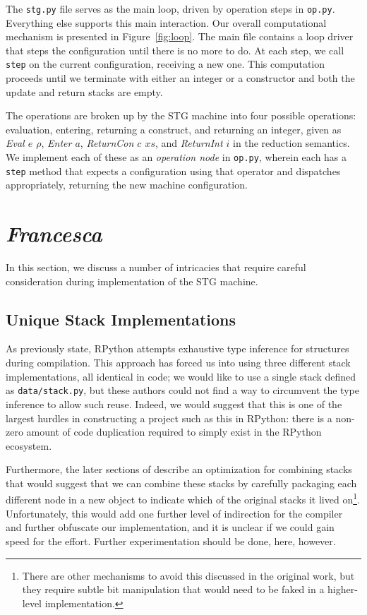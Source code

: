 \documentclass[preprint]{sigplanconf}
\begin{document}
The \lstinline{stg.py} file serves as the main loop, driven by operation steps
in \lstinline{op.py}. Everything else supports this main interaction.  
Our overall computational mechanism is presented in Figure~\ref{fig:loop}. The
main file contains a loop driver that steps the configuration until there is no
more to do. At each step, we call \lstinline{step} on the current configuration,
receiving a new one. This computation proceeds until we terminate with either
an integer or a constructor and both the update and return stacks are empty.

The operations are broken up by the STG machine into four possible operations:
evaluation, entering, returning a construct, and returning an integer, given
as \emph{Eval $e$ $\rho$}, \emph{Enter $a$}, \emph{ReturnCon $c$ $xs$}, and
\emph{ReturnInt $i$} in the reduction semantics. We implement each of these
as an \emph{operation node} in \lstinline{op.py}, wherein each has a
\lstinline{step} method that expects a configuration using that operator
and dispatches appropriately, returning the new machine configuration.

\section{\emph{Francesca}} %

In this section, we discuss a number of intricacies that require careful
consideration during implementation of the STG machine.

\subsection{Unique Stack Implementations}\label{sec:typeinf}

As previously state, RPython attempts exhaustive type inference for structures
during compilation. This approach has forced us into using three different
stack implementations, all identical in code; we would like to use a single
stack defined as \lstinline{data/stack.py}, but these authors could not find
a way to circumvent the type inference to allow such reuse.
Indeed, we would suggest that this is one of the largest
hurdles in constructing a project such as this in RPython: there is a non-zero
amount of code duplication required to simply exist in the RPython ecosystem.

Furthermore, the later sections of \citet{spj:stgmachine} describe an
optimization for combining stacks that would suggest that we can combine these
stacks by carefully packaging each different node in a new object to indicate
which of the original stacks it lived on\footnote{There are other mechanisms to
avoid this discussed in the original work, but they require subtle bit
manipulation that would need to be faked in a higher-level implementation.}. 
Unfortunately, this would add one further level of indirection for the compiler
and further obfuscate our implementation, and it is unclear if we could gain
speed for the effort.  Further experimentation should be done, here, however.  
\end{document}

